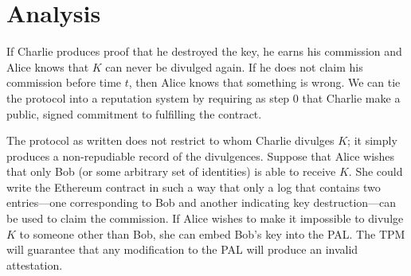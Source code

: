 \documentclass{article}
\begin{document}
\section{Analysis}

If Charlie produces proof that he destroyed the key, he earns his commission and Alice knows that $K$ can never be divulged again. If he does not claim his commission before time $t$, then Alice knows that something is wrong. We can tie the protocol into a reputation system by requiring as step 0 that Charlie make a public, signed commitment to fulfilling the contract.

The protocol as written does not restrict to whom Charlie divulges $K$; it simply produces a non-repudiable record of the divulgences. Suppose that Alice wishes that only Bob (or some arbitrary set of identities) is able to receive $K$. She could write the Ethereum contract in such a way that only a log that contains two entries---one corresponding to Bob and another indicating key destruction---can be used to claim the commission. If Alice wishes to make it impossible to divulge $K$ to someone other than Bob, she can embed Bob's key into the PAL. The TPM will guarantee that any modification to the PAL will produce an invalid attestation.
\end{document}
